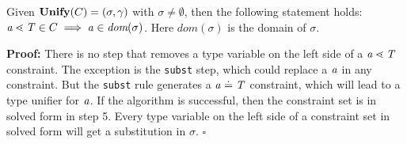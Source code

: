 \begin{lemma}[Exhaustiveness]\label{lemma:unify-exhaustive}
  Given $\textbf{Unify}{}(C) = (\sigma, \gamma{})$ with $\sigma \neq \emptyset$,
  then the following statement holds:
  $\mathit{ a } \lessdot \mathit{T} \in C \implies \mathit{ a } \in \textit{dom}(\sigma)$.
  Here $\textit{dom}(\sigma)$ is the domain of $\sigma$.
\end{lemma} %
\textbf{Proof:}
There is no step that removes a type variable on the left side of a $\mathit{ a } \lessdot \mathit{T}$ constraint.
The exception is the \texttt{subst} step, which could replace a $\mathit{ a }$ in any constraint.
But the \texttt{subst} rule generates a $\mathit{ a } \doteq \mathit{T}$ constraint, which will lead to a type unifier for $\mathit{ a }$.
If the \unify{} algorithm is successful, then the constraint set is in solved form in step 5.
Every type variable on the left side of a constraint set in solved form will get a substitution in $\sigma$.
\hfill $\square$

